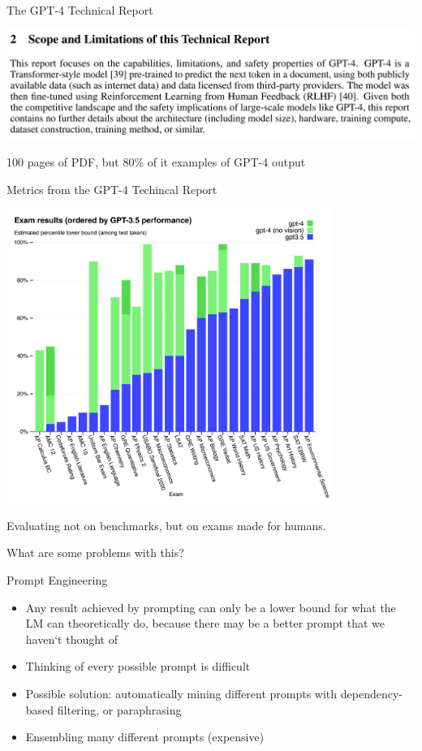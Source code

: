 \begin{vbframe}{The GPT-4 Technical Report}
	\vfill

	\includegraphics[width=\textwidth]{evaluation_figures/technical_report.png}
	\vfill

100 pages of PDF, but 80\% of it examples of GPT-4 output

\end{vbframe}
		
\begin{vbframe}{Metrics from the GPT-4 Techincal Report}

	\includegraphics[width=0.8\textwidth]{evaluation_figures/gpt_exam_results.png}

Evaluating not on benchmarks, but on exams made for humans.

What are some problems with this?

\end{vbframe}

\begin{vbframe}{Prompt Engineering}

	\vfill

\begin{itemize}
	\item Any result achieved by prompting can only be a lower bound for what the LM can theoretically do, because there may be a better prompt that we haven‘t thought of
	\item Thinking of every possible prompt is difficult
	\item Possible solution: automatically mining different prompts with dependency-based filtering, or paraphrasing
	\item Ensembling many different prompts (expensive)
\end{itemize}
\end{vbframe}


